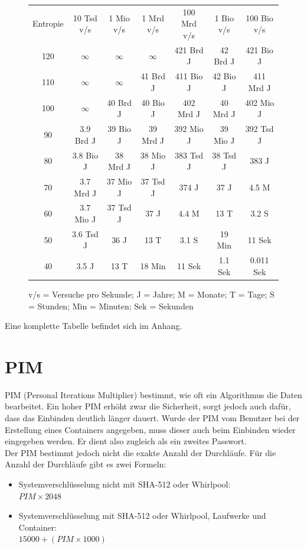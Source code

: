 \documentclass[12pt,a4paper]{scrreprt}
\begin{document}
\begin{figure}[h]
\begin{center}
\begin{tabular}{c|c|c|c|c|c|c}
Entropie&10 Tsd v/s&1 Mio v/s&1 Mrd v/s&100 Mrd v/s&1 Bio v/s&100 Bio v/s\\
120&$\infty$ &$\infty$ &$\infty$ & 421 Brd J & 42 Brd J & 421 Bio J\\
110&$\infty$ &$\infty$ & 41 Brd J & 411 Bio J & 42 Bio J & 411 Mrd J\\
100&$\infty$ & 40 Brd J & 40 Bio J & 402 Mrd J & 40 Mrd J & 402 Mio J\\
90&3.9 Brd J & 39 Bio J & 39 Mrd J & 392 Mio J & 39 Mio J & 392 Tsd J\\
80&3.8 Bio J & 38 Mrd J & 38 Mio J & 383 Tsd J & 38 Tsd J & 383 J\\
70&3.7 Mrd J & 37 Mio J & 37 Tsd J & 374 J & 37 J & 4.5 M\\
60&3.7 Mio J & 37 Tsd J & 37 J & 4.4 M & 13 T & 3.2 S\\
50&3.6 Tsd J & 36 J & 13 T & 3.1 S & 19 Min & 11 Sek\\
40&3.5 J & 13 T & 18 Min & 11 Sek & 1.1 Sek & 0.011 Sek
\end{tabular}
\end{center}
\caption{v/s = Versuche pro Sekunde; J = Jahre; M = Monate; T = Tage; S = Stunden; Min = Minuten; Sek = Sekunden}
\end{figure}

\noindent Eine komplette Tabelle befindet sich im Anhang.

\newpage

\section{PIM}
PIM (Personal Iterations Multiplier) bestimmt, wie oft ein Algorithmus die Daten bearbeitet. Ein hoher PIM erhöht zwar die Sicherheit, sorgt jedoch auch dafür, dass das Einbinden deutlich länger dauert. Wurde der PIM vom Benutzer bei der Erstellung eines Containers angegeben, muss dieser auch beim Einbinden wieder eingegeben werden. Er dient also zugleich als ein zweites Passwort. \\

\noindent Der PIM bestimmt jedoch nicht die exakte Anzahl der Durchläufe. Für die Anzahl der Durchläufe gibt es zwei Formeln:

\begin{itemize}
\item Systemverschlüsselung nicht mit SHA-512 oder Whirlpool:\\ $PIM\times 2048$
\item Systemverschlüsselung mit SHA-512 oder Whirlpool, Laufwerke und Container:\\ $15000+(PIM\times 1000)$
\end{itemize}
\end{document}
